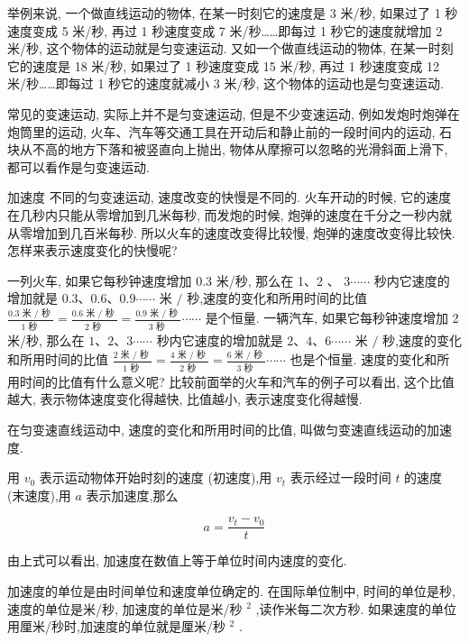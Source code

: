 \documentclass[10pt]{article}
\begin{document}
举例来说, 一个做直线运动的物体, 在某一时刻它的速度是 3 米/秒, 如果过了 1 秒速度变成 5 米/秒, 再过 1 秒速度变成 7 米/秒……即每过 1 秒它的速度就增加 2 米/秒, 这个物体的运动就是匀变速运动. 又如一个做直线运动的物体, 在某一时刻它的速度是 18 米/秒, 如果过了 1 秒速度变成 15 米/秒, 再过 1 秒速度变成 12 米/秒……即每过 1 秒它的速度就减小 3 米/秒, 这个物体的运动也是匀变速运动.

常见的变速运动, 实际上并不是匀变速运动, 但是不少变速运动, 例如发炮时炮弹在炮筒里的运动, 火车、汽车等交通工具在开动后和静止前的一段时间内的运动, 石块从不高的地方下落和被竖直向上抛出, 物体从摩擦可以忽略的光滑斜面上滑下, 都可以看作是匀变速运动.

加速度 不同的匀变速运动, 速度改变的快慢是不同的. 火车开动的时候, 它的速度在几秒内只能从零增加到几米每秒, 而发炮的时候, 炮弹的速度在千分之一秒内就从零增加到几百米每秒. 所以火车的速度改变得比较慢, 炮弹的速度改变得比较快. 怎样来表示速度变化的快慢呢?

一列火车, 如果它每秒钟速度增加 0.3 米/秒, 那么在 1、2 、 \(3\cdots \cdots\) 秒内它速度的增加就是 \({0.3}\text{、}{0.6}\text{、}{0.9}\cdots \cdots\) 米 \(/\) 秒,速度的变化和所用时间的比值 \(\frac{{0.3}\text{ 米 }/\text{ 秒 }}{1\text{ 秒 }} = \frac{{0.6}\text{ 米 }/\text{ 秒 }}{2\text{ 秒 }} = \frac{{0.9}\text{ 米 }/\text{ 秒 }}{3\text{ 秒 }}\cdots \cdots\) 是个恒量. 一辆汽车, 如果它每秒钟速度增加 2 米/秒, 那么在 \(1\text{、}2\text{、}3\cdots \cdots\) 秒内它速度的增加就是 \(2\text{、}4\text{、}6\cdots \cdots\) 米 \(/\) 秒,速度的变化和所用时间的比值 \(\frac{2\text{ 米 }/\text{ 秒 }}{1\text{ 秒 }} = \frac{4\text{ 米 }/\text{ 秒 }}{2\text{ 秒 }} = \frac{6\text{ 米 }/\text{ 秒 }}{3\text{ 秒 }}\cdots \cdots\) 也是个恒量. 速度的变化和所用时间的比值有什么意义呢? 比较前面举的火车和汽车的例子可以看出, 这个比值越大, 表示物体速度变化得越快, 比值越小, 表示速度变化得越慢.

在匀变速直线运动中, 速度的变化和所用时间的比值, 叫做匀变速直线运动的加速度.

用 \({v}_{0}\) 表示运动物体开始时刻的速度 (初速度),用 \({v}_{t}\) 表示经过一段时间 \(t\) 的速度 (末速度),用 \(a\) 表示加速度,那么

\[
a = \frac{{v}_{t} - {v}_{0}}{t}
\]

由上式可以看出, 加速度在数值上等于单位时间内速度的变化.

加速度的单位是由时间单位和速度单位确定的. 在国际单位制中, 时间的单位是秒, 速度的单位是米/秒, 加速度的单位是米/秒 \({}^{2}\) ,读作米每二次方秒. 如果速度的单位用厘米/秒时,加速度的单位就是厘米/秒 \({}^{2}\) .
\end{document}
